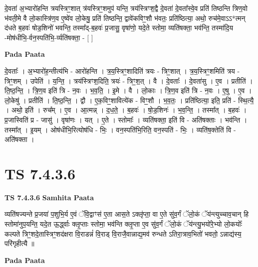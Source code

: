 \documentclass[17pt]{extarticle}
\begin{document}
दे॒वता॑ अ॒भ्यारो॑हन्ति त्रयस्त्रिꣳ॒॒शात् त्र॑यस्त्रिꣳ॒॒शमुप॑ यन्ति॒ त्रय॑स्त्रिꣳश॒द्वै दे॒वता॑ दे॒वता᳚स्वे॒व प्रति॑ तिष्ठन्ति त्रिण॒वो भ॑वती॒मे वै लो॒कास्त्रि॑ण॒व ए॒ष्वे॑व लो॒केषु॒ प्रति॑ तिष्ठन्ति॒ द्वावे॑कविꣳ॒॒शौ भ॑वतः॒ प्रति॑ष्ठित्या॒ अथो॒ रुच॑मे॒वाऽऽ*त्मन् द॑धते ब॒हवः॑ षोड॒शिनो॑ भवन्ति॒ तस्मा᳚द्-ब॒हवः॑ प्र॒जासु॒ वृषा॑णो॒ यदे॒ते स्तोमा॒ व्यति॑षक्ता॒ भव॑न्ति॒ तस्मा॑दि॒य -मोष॑धीभि॒-र्वन॒स्पति॑भि॒-र्व्यति॑षक्ता॒ - [  ] \newline

\textbf{Pada Paata} \newline

दे॒वताः᳚ । अ॒भ्यारो॑ह॒न्तीत्य॑भि - आरो॑हन्ति । त्र॒य॒स्त्रिꣳ॒॒शादिति॑ त्रयः - त्रिꣳ॒॒शात् । त्र॒य॒स्त्रिꣳ॒॒शमिति॑ त्रय - त्रिꣳ॒॒शम् । उपेति॑ । य॒न्ति॒ । त्रय॑स्त्रिꣳश॒दिति॒ त्रयः॑ - त्रिꣳ॒॒श॒त् । वै । दे॒वताः᳚ । दे॒वता॑सु । ए॒व । प्रतीति॑ । ति॒ष्ठ॒न्ति॒ । त्रि॒ण॒व इति॑ त्रि - न॒वः । भ॒व॒ति॒ । इ॒मे । वै । लो॒काः । त्रि॒ण॒व इति॑ त्रि - न॒वः । ए॒षु । ए॒व । लो॒केषु॑ । प्रतीति॑ । ति॒ष्ठ॒न्ति॒ । द्वौ । ए॒क॒विꣳ॒॒शावित्ये॑क - विꣳ॒॒शौ । भ॒व॒तः॒ । प्रति॑ष्ठित्या॒ इति॒ प्रति॑ - स्थि॒त्यै॒ । अथो॒ इति॑ । रुच᳚म् । ए॒व । आ॒त्मन्न् । द॒ध॒ते॒ । ब॒हवः॑ । षो॒ड॒शिनः॑ । भ॒व॒न्ति॒ । तस्मा᳚त् । ब॒हवः॑ । प्र॒जास्विति॑ प्र - जासु॑ । वृषा॑णः । यत् । ए॒ते । स्तोमाः᳚ । व्यति॑षक्ता॒ इति॑ वि - अति॑षक्ताः । भव॑न्ति । तस्मा᳚त् । इ॒यम् । ओष॑धीभि॒रित्योष॑धि - भिः॒ । वन॒स्पति॑भि॒रिति॒ वन॒स्पति॑ - भिः॒ । व्यति॑ष॒क्तेति॑ वि - अति॑षक्ता ।  \newline





\section{ TS 7.4.3.6 }

\textbf{TS 7.4.3.6 } \newline
\textbf{Samhita Paata} \newline

व्यति॑षज्यन्ते प्र॒जया॑ प॒शुभि॒र्य ए॒वं ॅवि॒द्वाꣳस॑ ए॒ता आस॒ते ऽक्लृ॑प्ता॒ वा ए॒ते सु॑व॒र्गं ॅलो॒कं ॅय॑न्त्युच्चाव॒चान् हि स्तोमा॑नुप॒यन्ति॒ यदे॒त ऊ॒र्द्ध्वाः क्लृ॒प्ताः स्तोमा॒ भव॑न्ति क्लृ॒प्ता ए॒व सु॑व॒र्गं ॅलो॒कं ॅय॑न्त्यु॒भयो॑रे॒भ्यो लो॒कयोः᳚ कल्पते त्रिꣳ॒॒शदे॒तास्त्रिꣳ॒॒शद॑क्षरा वि॒राडन्नं॑ वि॒राड् वि॒राजै॒वान्नाद्य॒मव॑ रुन्धते ऽतिरा॒त्राव॒भितो॑ भवतो॒ ऽन्नाद्य॑स्य॒ परि॑गृहीत्यै ॥ \newline

\textbf{Pada Paata} \newline
\end{document}
